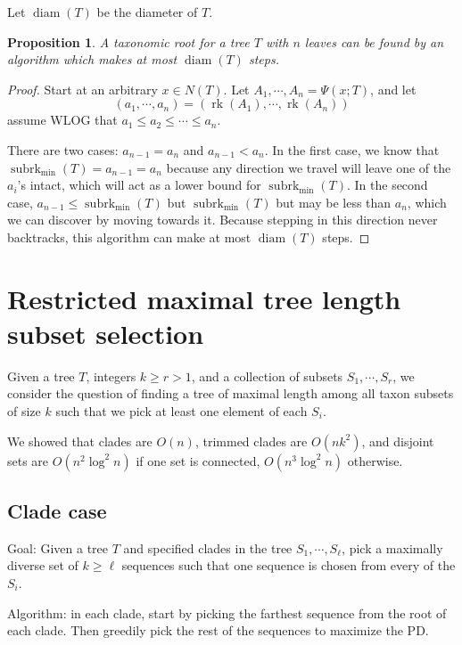 \documentclass{amsart}
\newcommand{\treecut}{\Psi}
\newcommand{\rk}{\operatorname{rk}}
\newcommand{\subrk}{\operatorname{subrk}}
\newcommand{\minsubrk}{\subrk_{\min}}
\newcommand{\diam}{\operatorname{diam}}
\newtheorem{prop}{Proposition}
\begin{document}
Let $\diam(T)$ be the diameter of $T$.

\begin{prop}
A taxonomic root for a tree $T$ with $n$ leaves can be found by an algorithm which makes at most $\diam(T)$ steps.
\end{prop}

\begin{proof}
  Start at an arbitrary $x \in N(T)$.
  Let ${A_1,\cdots,A_n} = \treecut(x;T)$, and let
  \[
    (a_1,\cdots,a_n) = (\rk(A_1), \cdots, \rk(A_n))
  \]
  assume WLOG that $a_1 \leq a_2 \leq \cdots \leq a_n$.

  There are two cases: $a_{n-1} = a_n$ and $a_{n-1} < a_n$.
  In the first case, we know that $\minsubrk(T) = a_{n-1} = a_n$ because any direction we travel will leave one of the $a_i$'s intact, which will act as a lower bound for $\minsubrk(T)$.
  In the second case, $a_{n-1} \leq \minsubrk(T)$ but $\minsubrk(T)$ but may be less than $a_n$, which we can discover by moving towards it.
  Because stepping in this direction never backtracks, this algorithm can make at most $\diam(T)$ steps.
\end{proof}



\section{Restricted maximal tree length subset selection}

Given a tree $T$, integers $k \ge r > 1$, and a collection of subsets $S_1, \cdots, S_r$, we consider the question of finding a tree of maximal length among all taxon subsets of size $k$ such that we pick at least one element of each $S_i$.

We showed that clades are $O(n)$, trimmed clades are $O(nk^2)$, and
disjoint sets are $O(n^2 \log^2 n)$ if one set is connected,
$O(n^3 \log^2 n)$ otherwise.

\subsection{Clade case}
Goal:
Given a tree $T$ and specified clades in the tree $S_1,\cdots, S_\ell$, pick a maximally diverse set of $k \ge \ell$ sequences such that one sequence is chosen from every of the $S_i$.

Algorithm:
in each clade, start by picking the farthest sequence from the root of each clade.
Then greedily pick the rest of the sequences to maximize the PD.
\end{document}
